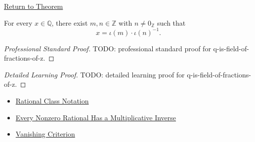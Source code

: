 \newpage
{}
\label{prf:q-is-field-of-fractions-of-z}

\begin{remark*}[Return]
\hyperref[thm:q-is-field-of-fractions-of-z]{Return to Theorem}
\end{remark*}

\begin{theorem*}
For every $x\in\mathbb{Q}$, there exist $m,n\in\mathbb{Z}$ with
$n\ne0_{\mathbb{Z}}$ such that
\[
x=\iota(m)\cdot \iota(n)^{-1}.
\]
\end{theorem*}

\begin{proof}[Professional Standard Proof]
\LRAProofBodyStart
TODO: professional standard proof for q-is-field-of-fractions-of-z.
\end{proof}

\begin{proof}[Detailed Learning Proof]
\LRAProofBodyStart
TODO: detailed learning proof for q-is-field-of-fractions-of-z.
\end{proof}

\begin{remark*}
\end{remark*}

\begin{dependencies}
\begin{itemize}
  \item \hyperref[def:rational-class-notation]{Rational Class Notation}
  \item \hyperref[thm:every-nonzero-rational-has-multiplicative-inverse]{Every Nonzero Rational Has a Multiplicative Inverse}
  \item \hyperref[lem:vanishing-criterion-q]{Vanishing Criterion}
\end{itemize}
\end{dependencies}

\clearpage
